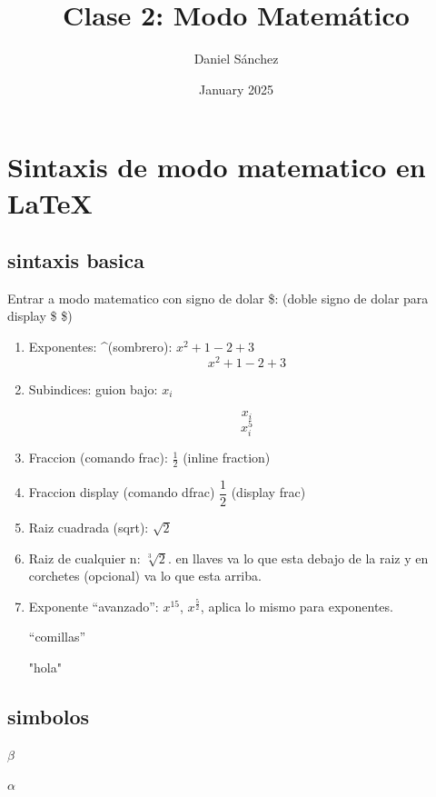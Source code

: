 \documentclass{article}
\title{Clase 2: Modo Matemático}
\author{Daniel Sánchez}
\date{January 2025}
\begin{document}
\maketitle %

\tableofcontents

\listoffigures

\listoftables

\clearpage

\lipsum

\section{Sintaxis de modo matematico en \LaTeX}

\subsection{sintaxis basica}

Entrar a modo matematico con signo de dolar \$: (doble signo de dolar para display \$ \$)

\begin{enumerate}
    \item Exponentes: \textasciicircum (sombrero): $x^2 + 1 - 2 + 3$ 
$$ x^2 + 1 - 2 +3$$
    \item Subindices: guion bajo: $x_i$

$$x_i$$
    $$x_i^5$$
    \item Fraccion (comando frac): $\frac{1}{2}$ (inline fraction)
    \item Fraccion display (comando dfrac) $\dfrac{1}{2}$ (display frac)
    \item Raiz cuadrada (sqrt): $\sqrt{2}$
    \item Raiz de cualquier n: $\sqrt[3]{2}$. en llaves va lo que esta debajo de la raiz y en corchetes (opcional) va lo que esta arriba. 
    \item Exponente “avanzado”: $x^{15}$, $x^{\frac{5}{2}}$, aplica lo mismo para exponentes. 

\enquote{comillas}

"hola"

\end{enumerate}


\subsection{simbolos}

$\beta$

$\alpha$
\end{document}
